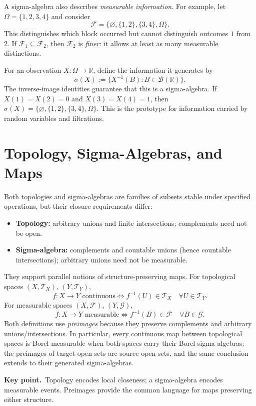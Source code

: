 \documentclass[10pt,a4paper]{article}
\newcommand{\R}{\mathbb R}
\newcommand{\B}{\mathcal B}
\newcommand{\key}[1]{\par\smallskip\textcolor{accent}{\textbf{Key point.}}\ #1\par}
\begin{document}
A sigma-algebra also describes \emph{measurable information}. For example,
let $\Omega=\{1,2,3,4\}$ and consider
\[
\mathcal F=\{\varnothing,\{1,2\},\{3,4\},\Omega\}.
\]
This distinguishes which block occurred but cannot distinguish outcomes
$1$ from $2$.
If $\mathcal F_1\subseteq\mathcal F_2$, then $\mathcal F_2$ is \emph{finer}:
it allows at least as many measurable distinctions.

For an observation $X:\Omega\to\R$, define the information it generates by
\[
\boxed{\sigma(X):=\{X^{-1}(B):B\in\B(\R)\}.}
\]
The inverse-image identities guarantee that this is a sigma-algebra. If
$X(1)=X(2)=0$ and $X(3)=X(4)=1$, then
$\sigma(X)=\{\varnothing,\{1,2\},\{3,4\},\Omega\}$.
This is the prototype for information carried by random variables and filtrations.

\section{Topology, Sigma-Algebras, and Maps}
Both topologies and sigma-algebras are families of subsets stable under
specified operations, but their closure requirements differ:
\begin{itemize}
\item \textbf{Topology:} arbitrary unions and finite intersections; complements need not be open.
\item \textbf{Sigma-algebra:} complements and countable unions (hence countable intersections); arbitrary unions need not be measurable.
\end{itemize}
They support parallel notions of structure-preserving maps.
For topological spaces $(X,\mathcal T_X)$, $(Y,\mathcal T_Y)$,
\[
\boxed{f:X\to Y\text{ continuous}
\iff f^{-1}(U)\in\mathcal T_X\quad\forall U\in\mathcal T_Y.}
\]
For measurable spaces $(X,\mathcal F)$, $(Y,\mathcal G)$,
\[
\boxed{f:X\to Y\text{ measurable}
\iff f^{-1}(B)\in\mathcal F\quad\forall B\in\mathcal G.}
\]
Both definitions use \emph{preimages} because they preserve complements and
arbitrary unions/intersections. In particular, every continuous map between
topological spaces is Borel measurable when both spaces carry their Borel
sigma-algebras: the preimages of target open sets are source open sets, and
the same conclusion extends to their generated sigma-algebras.

\key{Topology encodes local closeness; a sigma-algebra encodes measurable events. Preimages provide the common language for maps preserving either structure.}
\end{document}
